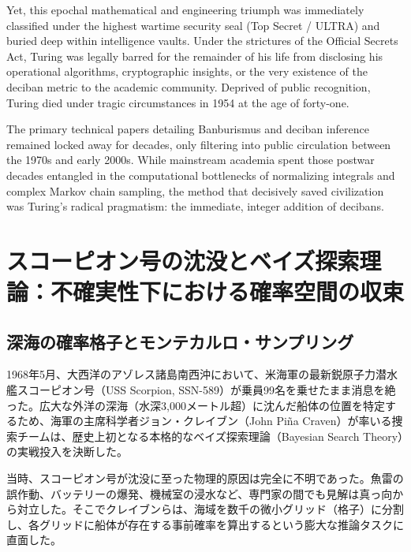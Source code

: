     Yet, this epochal mathematical and engineering triumph was immediately classified under the highest wartime security seal (Top Secret / ULTRA) and buried deep within intelligence vaults.
    Under the strictures of the Official Secrets Act, Turing was legally barred for the remainder of his life from disclosing his operational algorithms, cryptographic insights, or the very existence of the deciban metric to the academic community.
    Deprived of public recognition, Turing died under tragic circumstances in 1954 at the age of forty-one.

    The primary technical papers detailing Banburismus and deciban inference remained locked away for decades, only filtering into public circulation between the 1970s and early 2000s.
    While mainstream academia spent those postwar decades entangled in the computational bottlenecks of normalizing integrals and complex Markov chain sampling, the method that decisively saved civilization was Turing's radical pragmatism: the immediate, integer addition of decibans.
\fi

\ifja
    \section{スコーピオン号の沈没とベイズ探索理論：不確実性下における確率空間の収束}
    \label{sec:scorpion_search}

    \subsection{深海の確率格子とモンテカルロ・サンプリング}

    1968年5月、大西洋のアゾレス諸島南西沖において、米海軍の最新鋭原子力潜水艦スコーピオン号（USS Scorpion, SSN-589）が乗員99名を乗せたまま消息を絶った。広大な外洋の深海（水深3,000メートル超）に沈んだ船体の位置を特定するため、海軍の主席科学者ジョン・クレイブン（John Piña Craven）が率いる捜索チームは、歴史上初となる本格的なベイズ探索理論（Bayesian Search Theory）の実戦投入を決断した。

    当時、スコーピオン号が沈没に至った物理的原因は完全に不明であった。魚雷の誤作動、バッテリーの爆発、機械室の浸水など、専門家の間でも見解は真っ向から対立した。そこでクレイブンらは、海域を数千の微小グリッド（格子）に分割し、各グリッドに船体が存在する事前確率を算出するという膨大な推論タスクに直面した。


